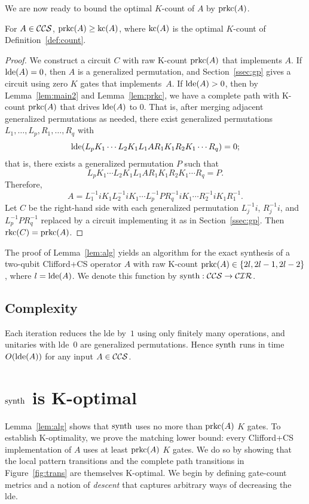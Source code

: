 \documentclass[reprint,amsmath,amssymb,aps,pra]{revtex4-2}
\begin{document}
We are now ready to bound the optimal $K$-count of $A$ by $\operatorname{prkc}(A)$.

\begin{lemma}
  \label{lem:alg}
  For $A\in {\mathcal{CCS}}$, $\operatorname{prkc}(A) \ge \operatorname{kc}(A)$, where $\operatorname{kc}(A)$ is the
  optimal $K$-count of Definition~\ref{def:count}.
\end{lemma}

\begin{proof}
  We construct a circuit $C$ with raw K-count $\operatorname{prkc}(A)$ that
  implements $A$. If $\operatorname{lde}(A) = 0$, then $A$ is a generalized
  permutation, and Section~\ref{ssec:gp} gives a circuit using zero
  $K$ gates that implements~$A$. If $\operatorname{lde}(A) > 0$, then by
  Lemma~\ref{lem:main2} and Lemma~\ref{lem:prkc}, we have a complete
  path with K-count $\operatorname{prkc}(A)$ that drives $\operatorname{lde}(A)$ to $0$. That is,
  after merging adjacent generalized permutations as needed, there
  exist generalized permutations $L_1,\ldots,L_p,R_1,\ldots,R_q$ with
  \[
    \operatorname{lde}(L_pK_1\cdots L_2K_1L_1AR_1K_1R_2K_1\cdots R_q) = 0;
  \]
  that is, there exists a generalized permutation $P$ such that
  \[
    L_pK_1\cdots L_2K_1L_1AR_1K_1R_2K_1\cdots R_q = P.
  \]
  Therefore,
  \[
    A = L_1^{-1}iK_1L_2^{-1}iK_1\cdots L_p^{-1}PR_q^{-1}iK_1\cdots
    R_2^{-1}iK_1R_1^{-1}.
  \]
  Let $C$ be the right-hand side with each generalized permutation
  $L_j^{-1}i$, $R_j^{-1}i$, and $L_p^{-1}PR_q^{-1}$ replaced by a
  circuit implementing it as in Section~\ref{ssec:gp}. Then
  $\operatorname{rkc}(C) = \operatorname{prkc}(A)$.
\end{proof}

The proof of Lemma~\ref{lem:alg} yields an algorithm for the exact
synthesis of a two-qubit Clifford+CS operator $A$ with raw K-count
$\operatorname{prkc}(A) \in \left\{2l, 2l-1, 2l-2\right\}$, where $l=\operatorname{lde}(A)$. We denote this
function by $\operatorname{synth} : {\mathcal{CCS}} \to {\mathcal{CIR}}$.

\subsection{Complexity}
Each iteration reduces the lde by~$1$ using only finitely many
operations, and unitaries with lde~$0$ are generalized permutations.
Hence $\operatorname{synth}$ runs in time $O(\operatorname{lde}(A))$ for any input
$A \in {\mathcal{CCS}}$.

\section{$\operatorname{synth}$ is K-optimal}

Lemma~\ref{lem:alg} shows that $\operatorname{synth}$ uses no more than $\operatorname{prkc}(A)$
$K$ gates. To establish K-optimality, we prove the matching lower
bound: every Clifford+CS implementation of $A$ uses at least
$\operatorname{prkc}(A)$ $K$ gates. We do so by showing that the local pattern
transitions and the complete path transitions in
Figure~\ref{fig:trans} are themselves K-optimal. We begin by defining
gate-count metrics and a notion of \emph{descent} that captures
arbitrary ways of decreasing the lde.
\end{document}
